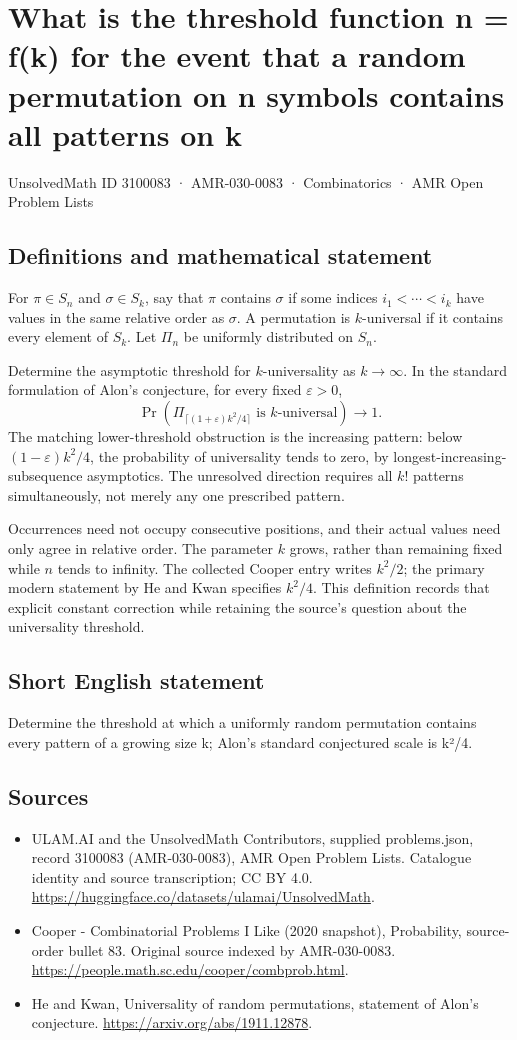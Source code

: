 \documentclass[11pt,a4paper]{article}
\begin{document}
\section*{What is the threshold function n = f(k) for the event that a random permutation on n symbols contains all patterns on k}\label{3100083}
{\small UnsolvedMath ID 3100083 · AMR-030-0083 · Combinatorics · AMR Open Problem Lists}
\subsection{Definitions and mathematical statement}
For $\pi\in S_n$ and $\sigma\in S_k$, say that $\pi$ contains
$\sigma$ if some indices $i_1<\cdots<i_k$ have values in the
same relative order as $\sigma$. A permutation is $k$-universal
if it contains every element of $S_k$. Let $\Pi_n$ be uniformly
distributed on $S_n$.

Determine the asymptotic threshold for $k$-universality as
$k\to\infty$. In the standard formulation of Alon's conjecture,
for every fixed $\varepsilon>0$,
\[
 \Pr\!\left(\Pi_{\lceil(1+\varepsilon)k^2/4\rceil}
                 \text{ is }k\text{-universal}\right)\longrightarrow1.
\]
The matching lower-threshold obstruction is the increasing
pattern: below $(1-\varepsilon)k^2/4$, the probability of
universality tends to zero, by longest-increasing-subsequence
asymptotics. The unresolved direction requires all $k!$ patterns
simultaneously, not merely any one prescribed pattern.

Occurrences need not occupy consecutive positions, and their
actual values need only agree in relative order. The parameter
$k$ grows, rather than remaining fixed while $n$ tends to infinity.
The collected Cooper entry writes $k^2/2$; the primary modern
statement by He and Kwan specifies $k^2/4$. This definition records
that explicit constant correction while retaining the source's
question about the universality threshold.
\subsection{Short English statement}
Determine the threshold at which a uniformly random permutation contains every pattern of a growing size k; Alon’s standard conjectured scale is k²/4.
\subsection{Sources}
\begin{itemize}
\item[S1] ULAM.AI and the UnsolvedMath Contributors, supplied problems.json, record 3100083 (AMR-030-0083), AMR Open Problem Lists. Catalogue identity and source transcription; CC BY 4.0.
\url{https://huggingface.co/datasets/ulamai/UnsolvedMath}.
\item[S2] Cooper - Combinatorial Problems I Like (2020 snapshot), Probability, source-order bullet 83. Original source indexed by AMR-030-0083.
\url{https://people.math.sc.edu/cooper/combprob.html}.
\item[S3] He and Kwan, Universality of random permutations, statement of Alon’s conjecture.
\url{https://arxiv.org/abs/1911.12878}.
\end{itemize}
\end{document}
